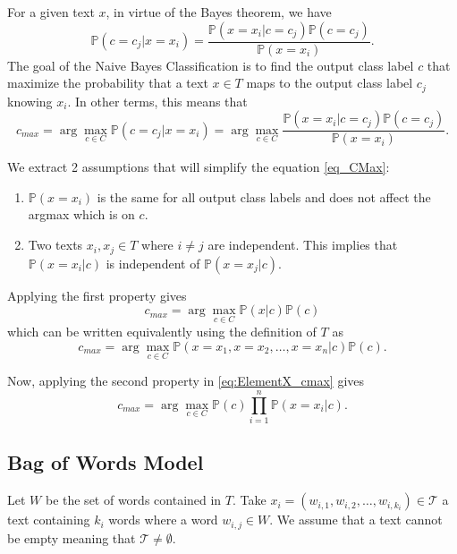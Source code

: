 \documentclass{article}
\begin{document}
For a given text $x$, in virtue of the Bayes theorem, we have
\begin{equation}
	\mathbb{P}(c = c_j | x = x_i) = \frac{\mathbb{P}(x = x_i | c = c_j)\mathbb{P}(c = c_j)}{\mathbb{P}(x = x_i)}.
\end{equation}
The goal of the Naive Bayes Classification is to find the output class label $c$ that maximize the probability that a text $x \in T$ maps to the output class label $c_j$ knowing $x_i$. In other terms, this means that
\begin{equation} \label{eq_CMax}
	c_{max} = \arg\max_{c \in C} \mathbb{P}(c = c_j | x = x_i) = \arg\max_{c \in C} \frac{\mathbb{P}(x = x_i | c = c_j)\mathbb{P}(c = c_j)}{\mathbb{P}(x = x_i)}.
\end{equation}

We extract 2 assumptions that will simplify the equation \eqref{eq_CMax}:
\begin{enumerate}
	\item $\mathbb{P}(x = x_i)$ is the same for all output class labels and does not affect the argmax which is on $c$.
	\item Two texts $x_i, x_j \in T$ where $i \neq j$ are independent. This implies that $\mathbb{P}(x = x_i | c)$ is independent of $\mathbb{P}(x = x_j | c)$.
\end{enumerate}

Applying the first property gives
\begin{equation}
	c_{max} = \arg\max_{c \in C} \mathbb{P}(x | c)\mathbb{P}(c)
\end{equation}
which can be written equivalently using the definition of $T$ as
\begin{equation} \label{eq:ElementX_cmax}
c_{max} = \arg\max_{c \in C} \mathbb{P}(x = x_1, x = x_2, \ldots, x = x_n | c)\mathbb{P}(c).
\end{equation}

Now, applying the second property in \eqref{eq:ElementX_cmax} gives
\begin{equation}
	c_{max} = \arg\max_{c \in C} \mathbb{P}(c) \prod\limits_{i = 1}^n \mathbb{P}(x = x_i | c).
\end{equation}


\subsection{Bag of Words Model}
Let $W$ be the set of words contained in $T$. Take $x_i = (w_{i,1}, w_{i,2}, \ldots, w_{i,k_i}) \in \mathcal{T}$ a text containing $k_i$ words where a word $w_{i,j} \in W$. We assume that a text cannot be empty meaning that $\mathcal{T} \neq \emptyset$.
\end{document}
